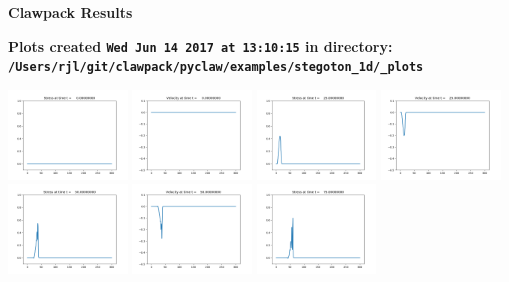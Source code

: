 \documentclass[11pt]{article}
\begin{document}
        \begin{center}{\Large\bf Clawpack Results}\vskip 5pt
        
        \bf Plots created {\tt Wed Jun 14 2017 at 13:10:15} in directory: \vskip 5pt
        \verb+/Users/rjl/git/clawpack/pyclaw/examples/stegoton_1d/_plots+
        \end{center}
        \vskip 5pt
        \includegraphics[width=0.2375\textwidth]{frame0000fig1.png}
\includegraphics[width=0.2375\textwidth]{frame0000fig2.png}
\includegraphics[width=0.2375\textwidth]{frame0001fig1.png}
\includegraphics[width=0.2375\textwidth]{frame0001fig2.png}
\vskip 10pt 
\includegraphics[width=0.2375\textwidth]{frame0002fig1.png}
\includegraphics[width=0.2375\textwidth]{frame0002fig2.png}
\includegraphics[width=0.2375\textwidth]{frame0003fig1.png}
\end{document}
